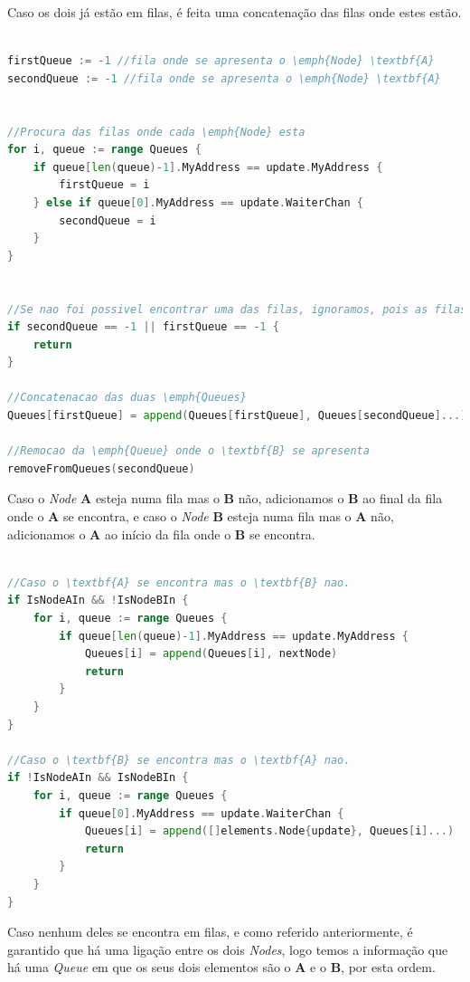 Caso os dois já estão em filas, é feita uma concatenação das filas onde estes estão.
\begin{lstlisting}[caption={Alterações nas filas caso o \emph{Node} seja do tipo ``Waiter With Request'' e ambos os \emph{Nodes} \textbf{A} e \textbf{B} se apresentam em filas },language=Go]

firstQueue := -1 //fila onde se apresenta o \emph{Node} \textbf{A}
secondQueue := -1 //fila onde se apresenta o \emph{Node} \textbf{A}


//Procura das filas onde cada \emph{Node} esta
for i, queue := range Queues {
	if queue[len(queue)-1].MyAddress == update.MyAddress {
		firstQueue = i
	} else if queue[0].MyAddress == update.WaiterChan {
		secondQueue = i
	}
}


//Se nao foi possivel encontrar uma das filas, ignoramos, pois as filas ja se encontram juntas
if secondQueue == -1 || firstQueue == -1 {
	return
}

//Concatenacao das duas \emph{Queues}
Queues[firstQueue] = append(Queues[firstQueue], Queues[secondQueue]...)

//Remocao da \emph{Queue} onde o \textbf{B} se apresenta
removeFromQueues(secondQueue)
\end{lstlisting}



Caso o \emph{Node} \textbf{A} esteja numa fila mas o \textbf{B} não, adicionamos o \textbf{B} ao final da fila onde o \textbf{A} se encontra, e
caso o \emph{Node} \textbf{B} esteja numa fila mas o \textbf{A} não, adicionamos o \textbf{A} ao início da fila onde o \textbf{B} se encontra.
\begin{lstlisting}[caption={Alterações nas filas caso o \emph{Node} seja do tipo ``Waiter With Request'' e pelo menos um se apresenta numa fila. },language=Go]

//Caso o \textbf{A} se encontra mas o \textbf{B} nao.
if IsNodeAIn && !IsNodeBIn {
	for i, queue := range Queues {
		if queue[len(queue)-1].MyAddress == update.MyAddress {
			Queues[i] = append(Queues[i], nextNode)
			return
		}
	}
}

//Caso o \textbf{B} se encontra mas o \textbf{A} nao.
if !IsNodeAIn && IsNodeBIn {
	for i, queue := range Queues {
		if queue[0].MyAddress == update.WaiterChan {
			Queues[i] = append([]elements.Node{update}, Queues[i]...)
			return
		}
	}
}


\end{lstlisting}


Caso nenhum deles se encontra em filas, e como referido anteriormente, é garantido que há uma ligação entre os dois \emph{Nodes}, logo temos a informação que há uma \emph{Queue} em que os seus dois elementos são o \textbf{A} e o \textbf{B}, por esta ordem.

